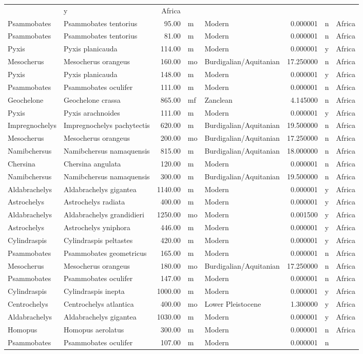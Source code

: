 \begin{landscape}
\begin{longtable}[]{@{}llrllrll@{}}
	& y & Africa\tabularnewline
	Psammobates & Psammobates tentorius & 95.00 & m & Modern & 0.000001 & n
	& Africa\tabularnewline
	Psammobates & Psammobates tentorius & 81.00 & m & Modern & 0.000001 & n
	& Africa\tabularnewline
	Pyxis & Pyxis planicauda & 114.00 & m & Modern & 0.000001 & y &
	Africa\tabularnewline
	Mesocherus & Mesocherus orangeus & 160.00 & mo & Burdigalian/Aquitanian
	& 17.250000 & n & Africa\tabularnewline
	Pyxis & Pyxis planicauda & 148.00 & m & Modern & 0.000001 & y &
	Africa\tabularnewline
	Psammobates & Psammobates oculifer & 111.00 & m & Modern & 0.000001 & n
	& Africa\tabularnewline
	Geochelone & Geochelone crassa & 865.00 & mf & Zanclean & 4.145000 & n &
	Africa\tabularnewline
	Pyxis & Pyxis arachnoides & 111.00 & m & Modern & 0.000001 & y &
	Africa\tabularnewline
	Impregnochelys & Impregnochelys pachytectis & 620.00 & m &
	Burdigalian/Aquitanian & 19.500000 & n & Africa\tabularnewline
	Mesocherus & Mesocherus orangeus & 200.00 & mo & Burdigalian/Aquitanian
	& 17.250000 & n & Africa\tabularnewline
	Namibchersus & Namibchersus namaquensis & 815.00 & m &
	Burdigalian/Aquitanian & 18.000000 & n & Africa\tabularnewline
	Chersina & Chersina angulata & 120.00 & m & Modern & 0.000001 & n &
	Africa\tabularnewline
	Namibchersus & Namibchersus namaquensis & 300.00 & m &
	Burdigalian/Aquitanian & 19.500000 & n & Africa\tabularnewline
	Aldabrachelys & Aldabrachelys gigantea & 1140.00 & m & Modern & 0.000001
	& y & Africa\tabularnewline
	Astrochelys & Astrochelys radiata & 400.00 & m & Modern & 0.000001 & y &
	Africa\tabularnewline
	Aldabrachelys & Aldabrachelys grandidieri & 1250.00 & mo & Modern &
	0.001500 & y & Africa\tabularnewline
	Astrochelys & Astrochelys yniphora & 446.00 & m & Modern & 0.000001 & y
	& Africa\tabularnewline
	Cylindraspis & Cylindraspis peltastes & 420.00 & m & Modern & 0.000001 &
	y & Africa\tabularnewline
	Psammobates & Psammobates geometricus & 165.00 & m & Modern & 0.000001 &
	n & Africa\tabularnewline
	Mesocherus & Mesocherus orangeus & 180.00 & mo & Burdigalian/Aquitanian
	& 17.250000 & n & Africa\tabularnewline
	Psammobates & Psammobates oculifer & 147.00 & m & Modern & 0.000001 & n
	& Africa\tabularnewline
	Cylindraspis & Cylindraspis inepta & 1000.00 & m & Modern & 0.000001 & y
	& Africa\tabularnewline
	Centrochelys & Centrochelys atlantica & 400.00 & mo & Lower Pleistocene
	& 1.300000 & y & Africa\tabularnewline
	Aldabrachelys & Aldabrachelys gigantea & 1030.00 & m & Modern & 0.000001
	& y & Africa\tabularnewline
	Homopus & Homopus aerolatus & 300.00 & m & Modern & 0.000001 & n &
	Africa\tabularnewline
	Psammobates & Psammobates oculifer & 107.00 & m & Modern & 0.000001 & n

\end{longtable}
\end{landscape}
